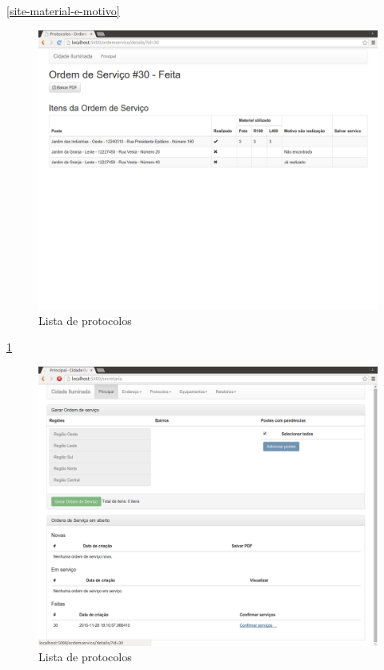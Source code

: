 \documentclass[
	article,			%
	11pt,				%
	oneside,			%
	a4paper,			%
	english,			%
	brazil,				%
	sumario=tradicional
	]{abntex2}
\begin{document}
\ref{site-material-e-motivo}

\begin{figure}[!htbp]
 \centering
 \caption{\label{site-os-feita}Lista de protocolos}
 \includegraphics[scale=0.25]{site/17-os_feita.png}
\end{figure}

\ref{site-os-feita}
\clearpage

\begin{figure}[!htbp]
 \centering
 \caption{\label{site-os-confirmacao}Lista de protocolos}
 \includegraphics[scale=0.25]{site/18-os_confirmacao.png}
\end{figure}
\end{document}
